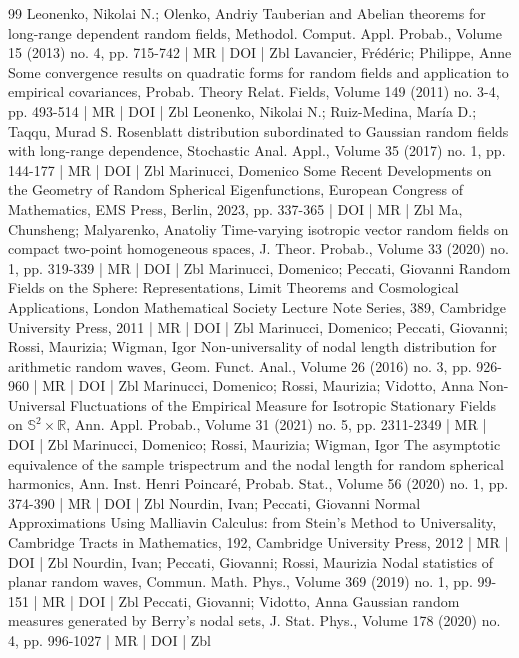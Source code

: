 \documentclass[10pt]{amsart}
\theoremstyle{definition}\newtheorem{defi}[theo]{Definition}\newtheorem{rema}[theo]{Remark}\newtheorem{exam}[theo]{Example}\newtheorem{exem}[theo]{Example}\newtheorem{nota}[theo]{Notation}
\begin{document}
\begin{thebibliography}{99}
 Leonenko, Nikolai N.; Olenko, Andriy Tauberian and Abelian theorems for long-range dependent random fields, Methodol. Comput. Appl. Probab., Volume 15 (2013) no. 4, pp. 715-742 | MR | DOI | Zbl
 Lavancier, Frédéric; Philippe, Anne Some convergence results on quadratic forms for random fields and application to empirical covariances, Probab. Theory Relat. Fields, Volume 149 (2011) no. 3-4, pp. 493-514 | MR | DOI | Zbl
 Leonenko, Nikolai N.; Ruiz-Medina, María D.; Taqqu, Murad S. Rosenblatt distribution subordinated to Gaussian random fields with long-range dependence, Stochastic Anal. Appl., Volume 35 (2017) no. 1, pp. 144-177 | MR | DOI | Zbl
 Marinucci, Domenico Some Recent Developments on the Geometry of Random Spherical Eigenfunctions, European Congress of Mathematics, EMS Press, Berlin, 2023, pp. 337-365 | DOI | MR | Zbl
 Ma, Chunsheng; Malyarenko, Anatoliy Time-varying isotropic vector random fields on compact two-point homogeneous spaces, J. Theor. Probab., Volume 33 (2020) no. 1, pp. 319-339 | MR | DOI | Zbl
 Marinucci, Domenico; Peccati, Giovanni Random Fields on the Sphere: Representations, Limit Theorems and Cosmological Applications, London Mathematical Society Lecture Note Series, 389, Cambridge University Press, 2011 | MR | DOI | Zbl
 Marinucci, Domenico; Peccati, Giovanni; Rossi, Maurizia; Wigman, Igor Non-universality of nodal length distribution for arithmetic random waves, Geom. Funct. Anal., Volume 26 (2016) no. 3, pp. 926-960 | MR | DOI | Zbl
 Marinucci, Domenico; Rossi, Maurizia; Vidotto, Anna Non-Universal Fluctuations of the Empirical Measure for Isotropic Stationary Fields on $\mathbb{S}^{2}\times \mathbb{R}$, Ann. Appl. Probab., Volume 31 (2021) no. 5, pp. 2311-2349 | MR | DOI | Zbl
 Marinucci, Domenico; Rossi, Maurizia; Wigman, Igor The asymptotic equivalence of the sample trispectrum and the nodal length for random spherical harmonics, Ann. Inst. Henri Poincaré, Probab. Stat., Volume 56 (2020) no. 1, pp. 374-390 | MR | DOI | Zbl
 Nourdin, Ivan; Peccati, Giovanni Normal Approximations Using Malliavin Calculus: from Stein’s Method to Universality, Cambridge Tracts in Mathematics, 192, Cambridge University Press, 2012 | MR | DOI | Zbl
 Nourdin, Ivan; Peccati, Giovanni; Rossi, Maurizia Nodal statistics of planar random waves, Commun. Math. Phys., Volume 369 (2019) no. 1, pp. 99-151 | MR | DOI | Zbl
 Peccati, Giovanni; Vidotto, Anna Gaussian random measures generated by Berry’s nodal sets, J. Stat. Phys., Volume 178 (2020) no. 4, pp. 996-1027 | MR | DOI | Zbl

\end{thebibliography}
\end{document}
